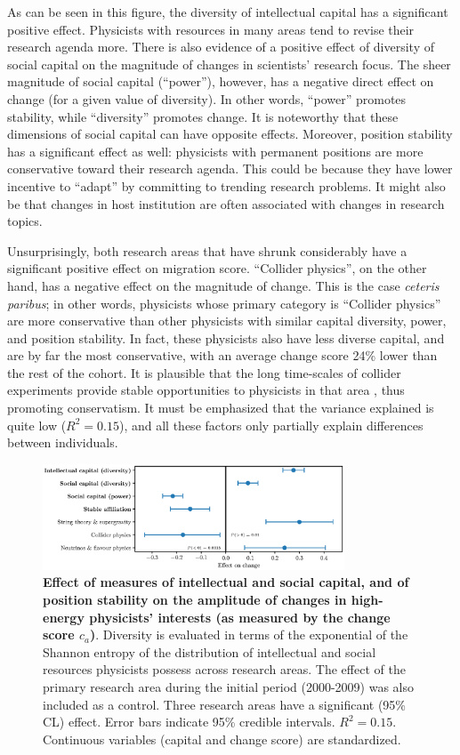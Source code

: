 \documentclass{article}
\begin{document}
As can be seen in this figure, the diversity of intellectual capital has a significant positive effect. Physicists with resources in many areas tend to revise their research agenda more. There is also evidence of a positive effect of diversity of social capital on the magnitude of changes in scientists' research focus. The sheer magnitude of social capital (``power''), however, has a negative direct effect on change (for a given value of diversity). In other words, ``power'' promotes stability, while ``diversity'' promotes change. It is noteworthy that these dimensions of social capital can have opposite effects. Moreover, position stability has a significant effect as well: physicists with permanent positions are more conservative toward their research agenda. This could be because they have lower incentive to ``adapt'' by committing to trending research problems. It might also be that changes in host institution are often associated with changes in research topics.

Unsurprisingly, both research areas that have shrunk considerably have a significant positive effect on migration score. ``Collider physics'', on the other hand, has a negative effect on the magnitude of change. This is the case \textit{ceteris paribus}; in other words, physicists whose primary category is ``Collider physics'' are more conservative than other physicists with similar capital diversity, power, and position stability. In fact, these physicists also have less diverse capital, and are by far the most conservative, with an average change score 24\% lower than the rest of the cohort. It is plausible that the long time-scales of collider experiments provide stable opportunities to physicists in that area \citep[p.~138]{galison1987how}, thus promoting conservatism. It must be emphasized that the variance explained is quite low ($R^2=0.15$), and all these factors only partially explain differences between individuals.

\begin{figure}[h]
    \centering
    \includegraphics[width=0.8\textwidth]{plots/change_score_effects_entropy_magnitude.eps}
    \caption{\textbf{Effect of measures of intellectual and social capital, and of position stability on the amplitude of changes in high-energy physicists' interests (as measured by the change score $c_a$)}. Diversity is evaluated in terms of the exponential of the Shannon entropy of the distribution of intellectual and social resources physicists possess across research areas. The effect of the primary research area during the initial period (2000-2009) was also included as a control. Three research areas have a significant (95\% CL) effect. Error bars indicate 95\% credible intervals. $R^2=0.15$. Continuous variables (capital and change score) are standardized.}
    \label{fig:change_score_effect}
\end{figure}
\end{document}

